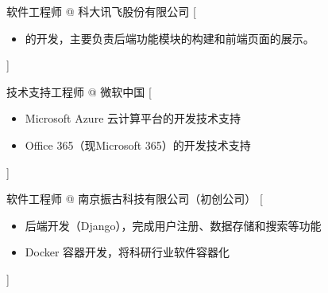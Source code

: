 \documentclass[zh]{resume}
\begin{document}
\begin{experiences}
    {软件工程师 @ 科大讯飞股份有限公司}%
    [\begin{itemize}
      \item {}的开发，主要负责后端功能模块的构建和前端页面的展示。
    \end{itemize}]

  \separator{0.5ex}
    {技术支持工程师 @ \icon{\faMicrosoft}微软中国}%
    [\begin{itemize}
      \item Microsoft Azure 云计算平台的开发技术支持
      \item Office 365（现Microsoft 365）的开发技术支持
    \end{itemize}]
  
  \separator{0.5ex}
    {软件工程师 @ 南京振古科技有限公司（初创公司）}%
    [\begin{itemize}
      \item 后端开发（Django），完成用户注册、数据存储和搜索等功能
      \item Docker 容器开发，将科研行业软件容器化
    \end{itemize}]
\end{experiences}
\end{document}
